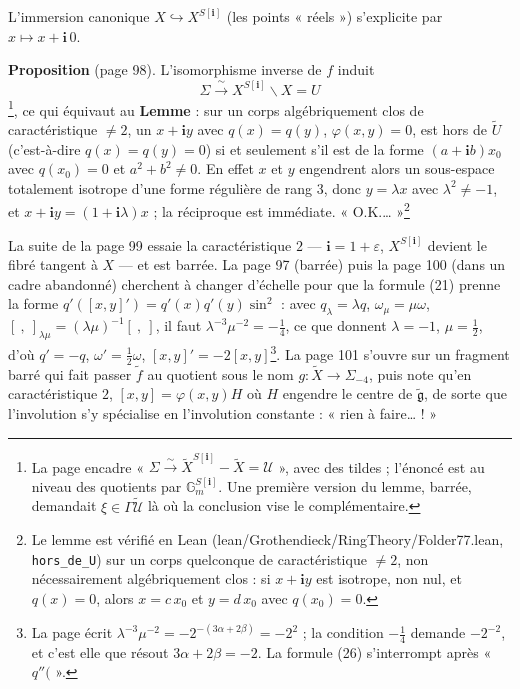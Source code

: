 \documentclass[11pt,a4paper]{article}
\begin{document}
L'immersion canonique $X \hookrightarrow X^{S[\mathbf{i}]}$ (les points « réels »)
s'explicite par $x \mapsto x + \mathbf{i}\,0$.

\textbf{Proposition} (page 98). L'isomorphisme inverse de $f$ induit
\[
  \Sigma \xrightarrow{\ \sim\ } X^{S[\mathbf{i}]} \smallsetminus X = U
\]
\footnote{La page encadre « $\Sigma \xrightarrow{\sim} \tilde{X}^{S[\mathbf{i}]} -
\tilde{X} = \mathcal{U}$ », avec des tildes ; l'énoncé est au niveau des quotients par
$\mathbb{G}_m^{S[\mathbf{i}]}$. Une première version du lemme, barrée, demandait $\xi
\in \Gamma\tilde{\mathcal{U}}$ là où la conclusion vise le complémentaire.}, ce qui
équivaut au \textbf{Lemme} : sur un corps algébriquement clos de caractéristique
$\neq 2$, un $x + \mathbf{i}y$ avec $q(x) = q(y)$, $\varphi(x, y) = 0$, est hors de
$\tilde{U}$ (c'est-à-dire $q(x) = q(y) = 0$) si et seulement s'il est de la forme $(a +
\mathbf{i}b)x_0$ avec $q(x_0) = 0$ et $a^2 + b^2 \neq 0$. En effet $x$ et $y$
engendrent alors un sous-espace totalement isotrope d'une forme régulière de rang
$3$, donc $y = \lambda x$ avec $\lambda^2 \neq -1$, et $x + \mathbf{i}y = (1 +
\mathbf{i}\lambda)x$ ; la réciproque est immédiate. « O.K.… »\footnote{Le
lemme est vérifié en Lean (lean/Grothendieck/RingTheory/Folder77.lean, \texttt{hors\_de\_U})
sur un corps quelconque de caractéristique $\neq 2$, non nécessairement
algébriquement clos : si $x + \mathbf{i}y$ est isotrope, non nul, et $q(x) = 0$,
alors $x = c\,x_0$ et $y = d\,x_0$ avec $q(x_0) = 0$.}

La suite de la page 99 essaie la caractéristique $2$ — $\mathbf{i} = 1 + \varepsilon$,
$X^{S[\mathbf{i}]}$ devient le fibré tangent à $X$ — et est barrée. La page 97 (barrée)
puis la page 100 (dans un cadre abandonné) cherchent à changer d'échelle pour que la
formule (21) prenne la forme $q'([x, y]') = q'(x)q'(y)\sin^2$ : avec $q_\lambda =
\lambda q$, $\omega_\mu = \mu\omega$, $[\ ,\ ]_{\lambda\mu} = (\lambda\mu)^{-1}[\ ,\ ]$,
il faut $\lambda^{-3}\mu^{-2} = -\tfrac{1}{4}$, ce que donnent $\lambda = -1$, $\mu =
\tfrac{1}{2}$, d'où $q' = -q$, $\omega' = \tfrac{1}{2}\omega$, $[x, y]' =
-2[x, y]$\footnote{La page écrit $\lambda^{-3}\mu^{-2} = -2^{-(3\alpha + 2\beta)} =
-2^{2}$ ; la condition $-\frac{1}{4}$ demande $-2^{-2}$, et c'est elle que résout
$3\alpha + 2\beta = -2$. La formule (26) s'interrompt après « $q''($ ».}. La page 101
s'ouvre sur un fragment barré qui fait passer $\tilde{f}$ au quotient sous le nom
$g : \tilde{X} \to \Sigma_{-4}$, puis note qu'en caractéristique $2$, $[x, y] =
\varphi(x, y)H$ où $H$ engendre le centre de $\tilde{\mathfrak{g}}$, de sorte que
l'involution s'y spécialise en l'involution constante : « rien à faire… ! »
\end{document}
